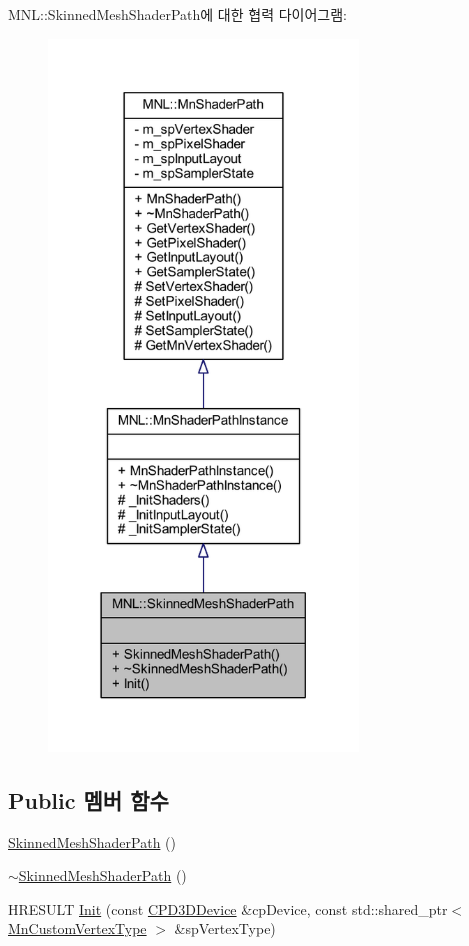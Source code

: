 M\+NL\+:\+:Skinned\+Mesh\+Shader\+Path에 대한 협력 다이어그램\+:\nopagebreak
\begin{figure}[H]
\begin{center}
\leavevmode
\includegraphics[width=233pt]{class_m_n_l_1_1_skinned_mesh_shader_path__coll__graph}
\end{center}
\end{figure}
\subsection*{Public 멤버 함수}
\begin{DoxyCompactItemize}
\item 
\hyperlink{class_m_n_l_1_1_skinned_mesh_shader_path_ac1f60601a04062e697c945731f9eed96}{Skinned\+Mesh\+Shader\+Path} ()
\item 
\hyperlink{class_m_n_l_1_1_skinned_mesh_shader_path_a6183007be47633848549f7c2c711d2d2}{$\sim$\+Skinned\+Mesh\+Shader\+Path} ()
\item 
H\+R\+E\+S\+U\+LT \hyperlink{class_m_n_l_1_1_skinned_mesh_shader_path_ae9c2c3747940326041af556e07ba13be}{Init} (const \hyperlink{namespace_m_n_l_a1eec210db8f309a4a9ac0d9658784c31}{C\+P\+D3\+D\+Device} \&cp\+Device, const std\+::shared\+\_\+ptr$<$ \hyperlink{class_m_n_l_1_1_mn_custom_vertex_type}{Mn\+Custom\+Vertex\+Type} $>$ \&sp\+Vertex\+Type)
\end{DoxyCompactItemize}
